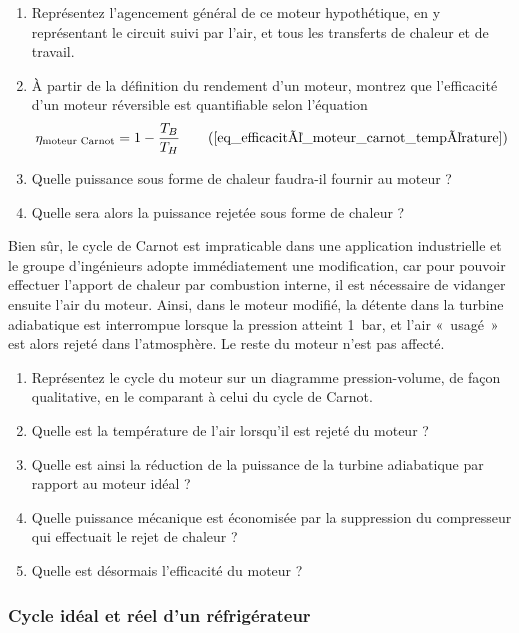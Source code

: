	\begin{enumerate}
		\item Représentez l’agencement général de ce moteur hypothétique, en y représentant le circuit suivi par l’air, et tous les transferts de chaleur et de travail.
		\item À partir de la définition du rendement d’un moteur, montrez que l’efficacité d’un moteur réversible est quantifiable selon l’équation
			\begin{equation}
				\eta_{\text{moteur Carnot}} = 1 - \frac{T_B}{T_H} \tag{\ref{eq_efficacité_moteur_carnot_température}}
			\end{equation}
		\item Quelle puissance sous forme de chaleur faudra-il fournir au moteur ?
		\item Quelle sera alors la puissance rejetée sous forme de chaleur ?
	\end{enumerate}

	Bien sûr, le cycle de Carnot est impraticable dans une application industrielle et le groupe d’ingénieurs adopte immédiatement une modification, car pour pouvoir effectuer l’apport de chaleur par combustion interne, il est nécessaire de vidanger ensuite l’air du moteur. Ainsi, dans le moteur modifié, la détente dans la turbine adiabatique est interrompue lorsque la pression atteint \SI{1}{\bar}, et l’air «~usagé~» est alors rejeté dans l’atmosphère. Le reste du moteur n’est pas affecté.
	
	\begin{enumerate}
		\item Représentez le cycle du moteur sur un diagramme pression-volume, de façon qualitative, en le comparant à celui du cycle de Carnot.
		\item Quelle est la température de l’air lorsqu’il est rejeté du moteur ?
		\item Quelle est ainsi la réduction de la puissance de la turbine adiabatique par rapport au moteur idéal ?
		\item Quelle puissance mécanique est économisée par la suppression du compresseur qui effectuait le rejet de chaleur ?
		\item Quelle est désormais l’efficacité du moteur ?
	\end{enumerate}


\subsubsection{Cycle idéal et réel d’un réfrigérateur}
\label{exo_cours_refrigerateur_carnot}
\wherefrom{[DS n°2 2011, 4pts]}

